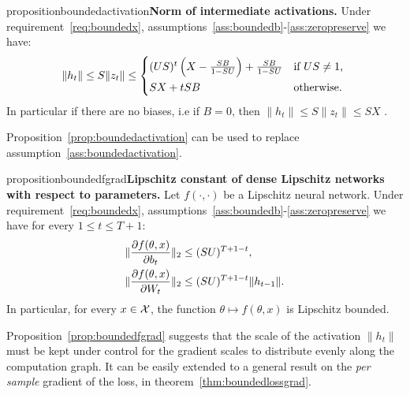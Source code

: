     \begin{restatable}{proposition}{boundedactivation}{\normalfont\textbf{Norm of intermediate activations.}}\label{prop:boundedactivation}
        Under requirement~\ref{req:boundedx}, assumptions~\ref{ass:boundedb}-\ref{ass:zeropreserve} we have:
            \begin{equation}
                \|h_t\|\leq S\|z_t\|\leq \begin{cases*}
                                             (US)^t\left(X-\frac{SB}{1-SU}\right)+\frac{SB}{1-SU} & if $US\neq 1$,\\
                                             SX+tSB & otherwise.
                                            \end{cases*}
            \end{equation}
        In particular if there are no biases, i.e if $B=0$, then $\|h_t\|\leq S\|z_t\|\leq SX$ .
    \end{restatable}

    Proposition~\ref{prop:boundedactivation} can be used to replace assumption~\ref{ass:boundedactivation}.

    \begin{restatable}{proposition}{boundedfgrad}{\normalfont\textbf{Lipschitz constant of dense Lipschitz networks with respect to parameters.}}\label{prop:boundedfgrad}
        Let $f(\cdot,\cdot)$ be a Lipschitz neural network. Under requirement~\ref{req:boundedx}, assumptions~\ref{ass:boundedb}-\ref{ass:zeropreserve} we have for every $1\leq t\leq T+1$:
        \begin{align}
            \|\frac{\partial f(\theta,x)}{\partial b_t}\|_2 &\leq (SU)^{T+1-t},\\
            \|\frac{\partial f(\theta,x)}{\partial W_t}\|_2 &\leq (SU)^{T+1-t}\|h_{t-1}\|.
        \end{align}
        In particular, for every $x\in\mathcal{X}$, the function $\theta\mapsto f(\theta,x)$ is Lipschitz bounded.  
        \end{restatable}
    
    Proposition~\ref{prop:boundedfgrad} suggests that the scale of the activation $\|h_t\|$ must be kept under control for the gradient scales to distribute evenly along the computation graph. It can be easily extended to a general result on the \textit{per sample} gradient of the loss, in theorem~\ref{thm:boundedlossgrad}.   
    
